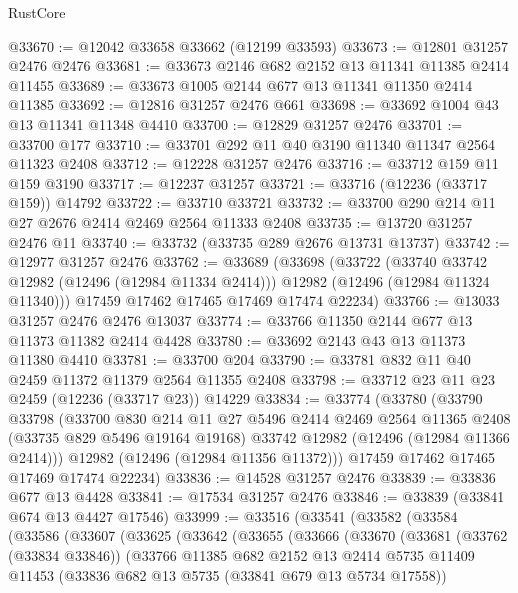 \begin{lexlean}{RustCore}
\begin{coremodule}
@33670 := @12042 @33658 @33662 (@12199 @33593)
@33673 := @12801 @31257 @2476 @2476
@33681 := @33673 @2146 @682 @2152 @13 @11341 @11385 @2414 @11455
@33689 := @33673 @1005 @2144 @677 @13 @11341 @11350 @2414 @11385
@33692 := @12816 @31257 @2476 @661
@33698 := @33692 @1004 @43 @13 @11341 @11348 @4410
@33700 := @12829 @31257 @2476
@33701 := @33700 @177
@33710 := @33701 @292 @11 @40 @3190 @11340 @11347 @2564 @11323 @2408
@33712 := @12228 @31257 @2476
@33716 := @33712 @159 @11 @159 @3190
@33717 := @12237 @31257
@33721 := @33716 (@12236 (@33717 @159)) @14792
@33722 := @33710 @33721
@33732 := @33700 @290 @214 @11 @27 @2676 @2414 @2469 @2564 @11333 @2408
@33735 := @13720 @31257 @2476 @11
@33740 := @33732 (@33735 @289 @2676 @13731 @13737)
@33742 := @12977 @31257 @2476
@33762 := @33689
    (@33698
      (@33722
        (@33740 @33742 @12982 (@12496 (@12984 @11334 @2414)))
        @12982
        (@12496 (@12984 @11324 @11340)))
      @17459
      @17462
      @17465
      @17469
      @17474
      @22234)
@33766 := @13033 @31257 @2476 @2476 @13037
@33774 := @33766 @11350 @2144 @677 @13 @11373 @11382 @2414 @4428
@33780 := @33692 @2143 @43 @13 @11373 @11380 @4410
@33781 := @33700 @204
@33790 := @33781 @832 @11 @40 @2459 @11372 @11379 @2564 @11355 @2408
@33798 := @33712 @23 @11 @23 @2459 (@12236 (@33717 @23)) @14229
@33834 := @33774
    (@33780
      (@33790
        @33798
        (@33700
          @830
          @214
          @11
          @27
          @5496
          @2414
          @2469
          @2564
          @11365
          @2408
          (@33735 @829 @5496 @19164 @19168)
          @33742
          @12982
          (@12496 (@12984 @11366 @2414)))
        @12982
        (@12496 (@12984 @11356 @11372)))
      @17459
      @17462
      @17465
      @17469
      @17474
      @22234)
@33836 := @14528 @31257 @2476
@33839 := @33836 @677 @13 @4428
@33841 := @17534 @31257 @2476
@33846 := @33839 (@33841 @674 @13 @4427 @17546)
@33999 := @33516
    (@33541
      (@33582
        (@33584
          (@33586
            (@33607
              (@33625
                (@33642
                  (@33655
                    (@33666
                      (@33670
                        (@33681
                          (@33762 (@33834 @33846))
                          (@33766
                            @11385
                            @682
                            @2152
                            @13
                            @2414
                            @5735
                            @11409
                            @11453
                            (@33836 @682 @13 @5735 (@33841 @679 @13 @5734 @17558))

\end{coremodule}
\end{lexlean}
